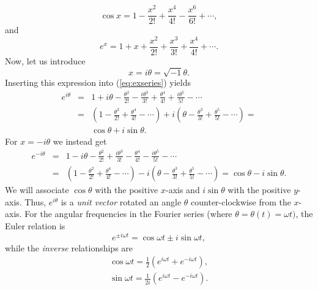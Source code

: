\begin{equation}
\cos x = 1 - \frac{x^2}{2!} + \frac{x^4}{4!} - \frac{x^6}{6!} + \cdots,
\end{equation}
and
\begin{equation}
e^x = 1+ x + \frac{x^2}{2!} + \frac{x^3}{3!} + \frac{x^4}{4!} + \cdots.
\label{eq:exseries}
\end{equation}
Now, let us introduce
$$
x = i \theta = \sqrt{-1} \theta.
$$
Inserting this expression into (\ref{eq:exseries}) yields
\begin{equation}
\begin{array}{rcl}
e^{i\theta} & = & \displaystyle 1 + i\theta-\frac{\theta^2}{2!} - \frac{i \theta^3}{3!}
+ \frac{\theta^4}{4!} + \frac{i \theta^5}{5!} - \cdots \\[14pt]
& = & \displaystyle \left ( 1 - \frac{\theta^2}{2!} + \frac{\theta^4}{4!} - \cdots\right )
+ i \left ( \theta - \frac{\theta^3}{3!} + \frac{\theta^5}{5!} - \cdots \right ) = \\[14pt]
& & \cos \theta + i \sin \theta.
\end{array}
\end{equation}
For $x = -i\theta$ we instead get
$$
\begin{array}{rcl}
e^{-i\theta} & = & \displaystyle 1 - i\theta - \frac{\theta^2}{2!} + \frac{i \theta^3}{3!} - \frac{\theta^4}{4!} - \frac{i \theta^5}{5!} - \cdots \\[14pt]
& = & \displaystyle \left ( 1 -\frac{\theta^2}{2!} + \frac{\theta^4}{4!} - \cdots\right ) - i\left ( \theta - \frac{\theta^3}{3!} + \frac{\theta^5}{5!} - \cdots\right ) = \cos \theta - i \sin \theta.
\end{array}
$$
We will associate $\cos \theta$ with the positive $x$-axis and $i \sin \theta$ with the positive $y$-axis.
Thus, $e^{i\theta}$ is a \emph{unit vector} rotated an angle $\theta$ counter-clockwise from the $x$-axis. For the
angular frequencies in the Fourier series (where $\theta = \theta(t) = \omega t)$, the Euler relation is
\begin{equation}
\boxed{e^{\pm i\omega t} = \cos \omega t \pm i \sin \omega t,}
\label{eq:eulerrelation}
\end{equation}
while the \emph{inverse} relationships are
\begin{equation}
\begin{array}{c}
\cos \omega t = \frac{1}{2} (e^{i\omega t} + e^{-i \omega t} ), \\[14pt]
\sin \omega t = \frac{1}{2 i } (e^{i\omega t} - e^{-i \omega t} ).
\end{array}
\end{equation}
